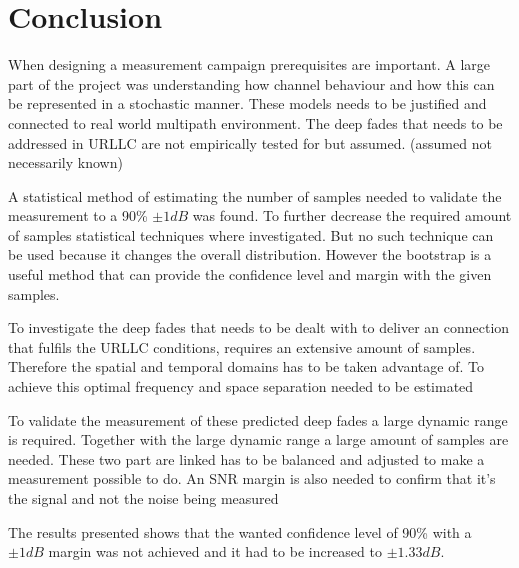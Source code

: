 \chapter{Conclusion}

When designing a measurement campaign prerequisites are important. A large part of the project was understanding how channel behaviour and how this can be represented in a stochastic manner. These models needs to be justified and connected to real world multipath environment. The deep fades that needs to be addressed in \gls{URLLC} are not empirically tested for but assumed. (assumed not necessarily known)

A statistical method of estimating the number of samples needed to validate the measurement to a 90\% $\pm 1dB$ was found. To further decrease the required amount of samples statistical techniques where investigated. But no such technique can be used because it changes the overall distribution. However the bootstrap is a useful method that can provide the confidence level and margin with the given samples.

To investigate the deep fades that needs to be dealt with to deliver an connection that fulfils the \gls{URLLC} conditions, requires an extensive amount of samples. Therefore the spatial and temporal domains has to be taken advantage of. To achieve this optimal frequency and space separation needed to be estimated

To validate the measurement of these predicted deep fades a large dynamic range is required. Together with the large dynamic range a large amount of samples are needed. These two part are linked has to be balanced and adjusted to make a measurement possible to do. An SNR margin is also needed to confirm that it's the signal and not the noise being measured

The results presented shows that the wanted confidence level of 90\% with a $\pm 1dB$ margin was not achieved and it had to be increased to $\pm 1.33dB$.





